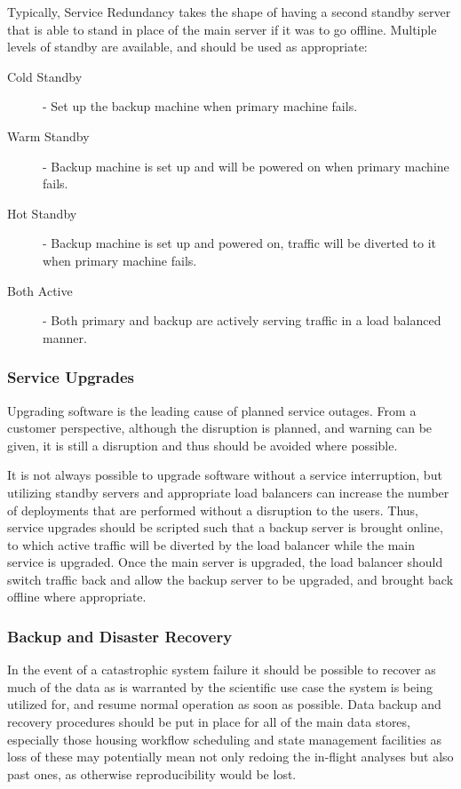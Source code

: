 Typically, Service Redundancy takes the shape of having a second standby server that is able to stand in place of the main server if it was to go offline. Multiple levels of standby are available, and should be used as appropriate:

\begin{description}
\item [Cold Standby] - Set up the backup machine when primary machine fails.
\item [Warm Standby] - Backup machine is set up and will be powered on when primary machine fails.
\item [Hot Standby] - Backup machine is set up and powered on, traffic will be diverted to it when primary machine fails.
\item [Both Active] - Both primary and backup are actively serving traffic in a load balanced manner. 
\end{description}

\subsubsection {Service Upgrades}

Upgrading software is the leading cause of planned service outages. From a customer perspective, although the disruption is planned, and warning can be given, it is still a disruption and thus should be avoided where possible. 

It is not always possible to upgrade software without a service interruption, but utilizing standby servers and appropriate load balancers can increase the number of deployments that are performed without a disruption to the users. Thus, service upgrades should be scripted such that a backup server is brought online, to which active traffic will be diverted by the load balancer while the main service is upgraded. Once the main server is upgraded, the load balancer should switch traffic back and allow the backup server to be upgraded, and brought back offline where appropriate.

\subsubsection {Backup and Disaster Recovery}

In the event of a catastrophic system failure it should be possible to recover as much of the data as is warranted by the scientific use case the system is being utilized for, and resume normal operation as soon as possible. Data backup and recovery procedures should be put in place for all of the main data stores, especially those housing workflow scheduling and state management facilities as loss of these may potentially mean not only redoing the in-flight analyses but also past ones, as otherwise reproducibility would be lost.

